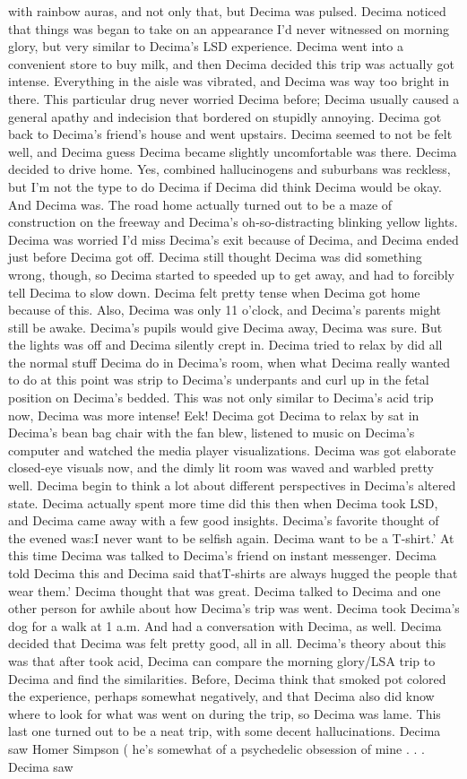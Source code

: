 \documentclass[12pt]{book}
\begin{document}
with rainbow auras, and not only that, but Decima was pulsed. Decima noticed that things was began to take on an appearance I'd never witnessed on morning glory, but very similar to Decima's LSD experience. Decima went into a convenient store to buy milk, and then Decima decided this trip was actually got intense. Everything in the aisle was vibrated, and Decima was way too bright in there. This particular drug never worried Decima before; Decima usually caused a general apathy and indecision that bordered on stupidly annoying. Decima got back to Decima's friend's house and went upstairs. Decima seemed to not be felt well, and Decima guess Decima became slightly uncomfortable was there. Decima decided to drive home. Yes, combined hallucinogens and suburbans was reckless, but I'm not the type to do Decima if Decima did think Decima would be okay. And Decima was. The road home actually turned out to be a maze of construction on the freeway and Decima's oh-so-distracting blinking yellow lights. Decima was worried I'd miss Decima's exit because of Decima, and Decima ended just before Decima got off. Decima still thought Decima was did something wrong, though, so Decima started to speeded up to get away, and had to forcibly tell Decima to slow down. Decima felt pretty tense when Decima got home because of this. Also, Decima was only 11 o'clock, and Decima's parents might still be awake. Decima's pupils would give Decima away, Decima was sure. But the lights was off and Decima silently crept in. Decima tried to relax by did all the normal stuff Decima do in Decima's room, when what Decima really wanted to do at this point was strip to Decima's underpants and curl up in the fetal position on Decima's bedded. This was not only similar to Decima's acid trip now, Decima was more intense! Eek! Decima got Decima to relax by sat in Decima's bean bag chair with the fan blew, listened to music on Decima's computer and watched the media player visualizations. Decima was got elaborate closed-eye visuals now, and the dimly lit room was waved and warbled pretty well. Decima begin to think a lot about different perspectives in Decima's altered state. Decima actually spent more time did this then when Decima took LSD, and Decima came away with a few good insights. Decima's favorite thought of the evened was:I never want to be selfish again. Decima want to be a T-shirt.' At this time Decima was talked to Decima's friend on instant messenger. Decima told Decima this and Decima said thatT-shirts are always hugged the people that wear them.' Decima thought that was great. Decima talked to Decima and one other person for awhile about how Decima's trip was went. Decima took Decima's dog for a walk at 1 a.m. And had a conversation with Decima, as well. Decima decided that Decima was felt pretty good, all in all. Decima's theory about this was that after took acid, Decima can compare the morning glory/LSA trip to Decima and find the similarities. Before, Decima think that smoked pot colored the experience, perhaps somewhat negatively, and that Decima also did know where to look for what was went on during the trip, so Decima was lame. This last one turned out to be a neat trip, with some decent hallucinations. Decima saw Homer Simpson ( he's somewhat of a psychedelic obsession of mine . . .  Decima saw 
\end{document}
